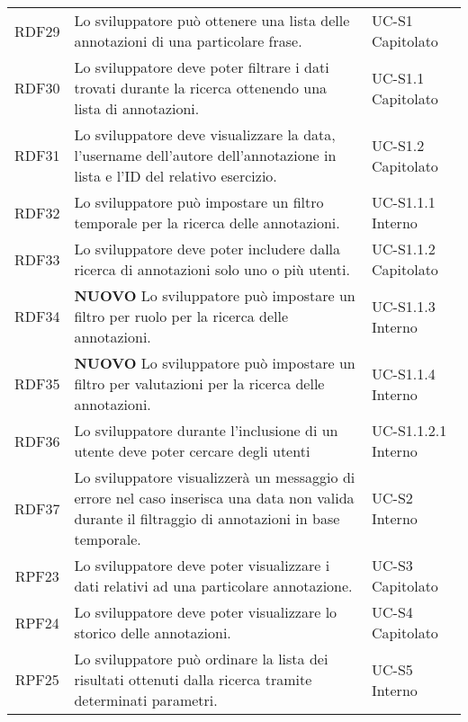 \begin{tabularx}{\textwidth}{| c | p{10cm} | X |}
		RDF29 & Lo sviluppatore può ottenere una lista delle annotazioni di una particolare frase. & UC-S1 \newline Capitolato\\
		RDF30 & Lo sviluppatore deve poter filtrare i dati trovati durante la ricerca ottenendo una lista di annotazioni. & UC-S1.1 \newline Capitolato\\
		RDF31 & Lo sviluppatore deve visualizzare la data, l'username dell'autore dell'annotazione in lista e l'ID del relativo esercizio. & UC-S1.2 \newline Capitolato\\
		RDF32 & Lo sviluppatore può impostare un filtro temporale per la ricerca delle annotazioni. & UC-S1.1.1 \newline Interno\\
		RDF33 & Lo sviluppatore deve poter includere dalla ricerca di annotazioni solo uno o più utenti. & UC-S1.1.2 \newline Capitolato\\
		RDF34 & \textbf{NUOVO} Lo sviluppatore può impostare un filtro per ruolo per la ricerca delle annotazioni. & UC-S1.1.3 \newline Interno\\
		RDF35 & \textbf{NUOVO} Lo sviluppatore può impostare un filtro per valutazioni per la ricerca delle annotazioni. & UC-S1.1.4 \newline Interno\\
		RDF36 & Lo sviluppatore durante l'inclusione di un utente deve poter cercare degli utenti & UC-S1.1.2.1 \newline Interno\\		
		RDF37 & Lo sviluppatore visualizzerà un messaggio di errore nel caso inserisca una data non valida durante il filtraggio di annotazioni in base temporale. & UC-S2 \newline Interno\\
		RPF23 & Lo sviluppatore deve poter visualizzare i dati relativi ad una particolare annotazione. & UC-S3 \newline Capitolato\\
		RPF24 & Lo sviluppatore deve poter visualizzare lo storico delle annotazioni. & UC-S4 \newline Capitolato\\
		RPF25 & Lo sviluppatore può ordinare la lista dei risultati ottenuti dalla ricerca tramite determinati parametri. & UC-S5 \newline Interno\\	

\end{tabularx}
